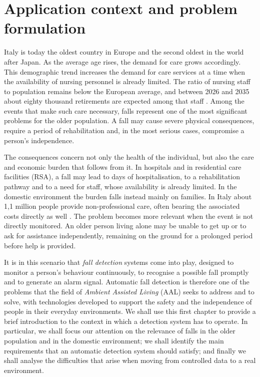 \chapter{Application context and problem formulation}
\label{cap:contesto}

Italy is today the oldest country in Europe and the second
oldest in the world after Japan. As the average age rises, the demand for
care grows accordingly. This demographic trend increases the demand for care services at a time when the availability of nursing personnel is already limited. The ratio of nursing staff to population remains below the European average, and between 2026 and 2035 about eighty thousand retirements are expected among that staff \cite{FN}.
Among the events that make such care necessary, falls represent one of the
most significant problems for the older population. A fall may cause severe
physical consequences, require a period of rehabilitation and, in the most
serious cases, compromise a person's independence.

The consequences concern not only the health of the individual, but also the
care and economic burden that follows from it. In hospitals and in
residential care facilities (RSA), a fall may lead to days of
hospitalisation, to a rehabilitation pathway and to a need for staff, whose availability is already limited. In the domestic environment the burden
falls instead mainly on families. In Italy about 1,1 million people provide
non-professional care, often bearing the associated costs directly as well
\cite{FN}.
The problem becomes more relevant when the event is not directly monitored.
An older person living alone may be unable to get up or to ask for
assistance independently, remaining on the ground for a prolonged period
before help is provided.

It is in this scenario that \emph{fall detection} systems come into play, designed
to monitor a person's behaviour continuously, to recognise a possible fall
promptly and to generate an alarm signal. Automatic fall detection is
therefore one of the problems that the field of \emph{Ambient Assisted
Living} (AAL) seeks to address and to solve, with technologies developed to
support the safety and the independence of people in their everyday
environments.
We shall use this first chapter to provide a brief introduction to the
context in which a detection system has to operate. In particular, we shall
focus our attention on the relevance of falls in the older population and in
the domestic environment; we shall identify the main requirements that an
automatic detection system should satisfy; and finally we shall analyse the
difficulties that arise when moving from controlled data to a real
environment.

